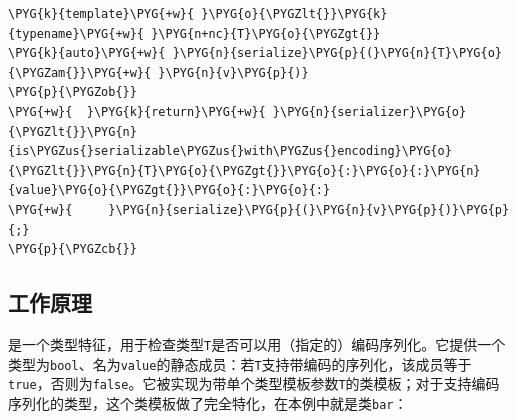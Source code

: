 \begin{itemize}

\begin{codeblockbg}
\begin{Verbatim}[commandchars=\\\{\},breaklines=true,breakanywhere=true,fontsize=\codefont,xleftmargin=17bp]
\PYG{k}{template}\PYG{+w}{ }\PYG{o}{\PYGZlt{}}\PYG{k}{typename}\PYG{+w}{ }\PYG{n+nc}{T}\PYG{o}{\PYGZgt{}}
\PYG{k}{auto}\PYG{+w}{ }\PYG{n}{serialize}\PYG{p}{(}\PYG{n}{T}\PYG{o}{\PYGZam{}}\PYG{+w}{ }\PYG{n}{v}\PYG{p}{)}
\PYG{p}{\PYGZob{}}
\PYG{+w}{  }\PYG{k}{return}\PYG{+w}{ }\PYG{n}{serializer}\PYG{o}{\PYGZlt{}}\PYG{n}{is\PYGZus{}serializable\PYGZus{}with\PYGZus{}encoding}\PYG{o}{\PYGZlt{}}\PYG{n}{T}\PYG{o}{\PYGZgt{}}\PYG{o}{:}\PYG{o}{:}\PYG{n}{value}\PYG{o}{\PYGZgt{}}\PYG{o}{:}\PYG{o}{:}
\PYG{+w}{     }\PYG{n}{serialize}\PYG{p}{(}\PYG{n}{v}\PYG{p}{)}\PYG{p}{;}
\PYG{p}{\PYGZcb{}}
\end{Verbatim}
\end{codeblockbg}


\end{itemize}



\subsection{工作原理}



是一个类型特征，用于检查类型\texttt{T}是否可以用（指定的）编码序列化。它提供一个类型为\texttt{bool}、名为\texttt{value}的静态成员：若\texttt{T}支持带编码的序列化，该成员等于\texttt{true}，否则为\texttt{false}。它被实现为带单个类型模板参数\texttt{T}的类模板；对于支持编码序列化的类型，这个类模板做了完全特化，在本例中就是类\texttt{bar}：



